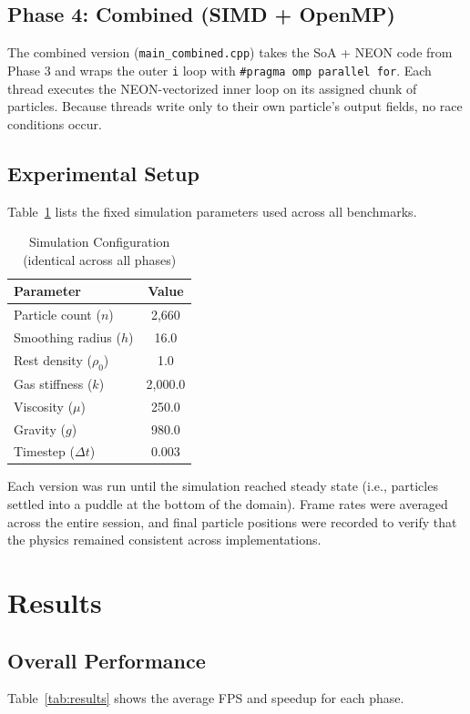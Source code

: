 \documentclass[12pt, a4paper]{article}
\begin{document}
\subsection{Phase 4: Combined (SIMD + OpenMP)}
The combined version (\texttt{main\_combined.cpp}) takes the SoA + NEON code from Phase 3 and wraps the outer \texttt{i} loop with \texttt{\#pragma omp parallel for}. Each thread executes the NEON-vectorized inner loop on its assigned chunk of particles. Because threads write only to their own particle's output fields, no race conditions occur.

\subsection{Experimental Setup}
Table~\ref{tab:config} lists the fixed simulation parameters used across all benchmarks.

\begin{table}[h]
\centering
\caption{Simulation Configuration (identical across all phases)}
\label{tab:config}
\begin{tabular}{@{}lc@{}}
\toprule
\textbf{Parameter} & \textbf{Value} \\ \midrule
Particle count ($n$) & 2,660 \\
Smoothing radius ($h$) & 16.0 \\
Rest density ($\rho_0$) & 1.0 \\
Gas stiffness ($k$) & 2,000.0 \\
Viscosity ($\mu$) & 250.0 \\
Gravity ($g$) & 980.0 \\
Timestep ($\Delta t$) & 0.003 \\
\bottomrule
\end{tabular}
\end{table}

Each version was run until the simulation reached steady state (i.e., particles settled into a puddle at the bottom of the domain). Frame rates were averaged across the entire session, and final particle positions were recorded to verify that the physics remained consistent across implementations.

\section{Results}

\subsection{Overall Performance}
Table~\ref{tab:results} shows the average FPS and speedup for each phase.
\end{document}
